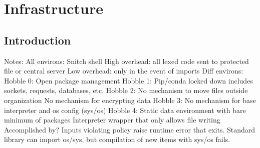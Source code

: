 \section{Infrastructure}

\thispagestyle{section_start_style}

\subsection*{Introduction}

Notes:
	All environs:
		Snitch shell
			High overhead: all lexed code sent to protected file or central server
			Low overhead: only in the event of imports
	Diff environs:
		Hobble 0:
			Open package management
		Hobble 1:
			Pip/conda locked down
			includes sockets, requests, databases, etc.
		Hobble 2:
			No mechanism to move files outside organization
			No mechanism for encrypting data
		Hobble 3:
			No mechanism for base interpreter and os config (sys/os)
		Hobble 4:
			Static data environment with bare minimum of packages
			Interpreter wrapper that only allows file writing
		Accomplished by?
			Inputs violating policy raise runtime error that exits.
			Standard library can import os/sys, but compilation of new items with sys/os fails.
